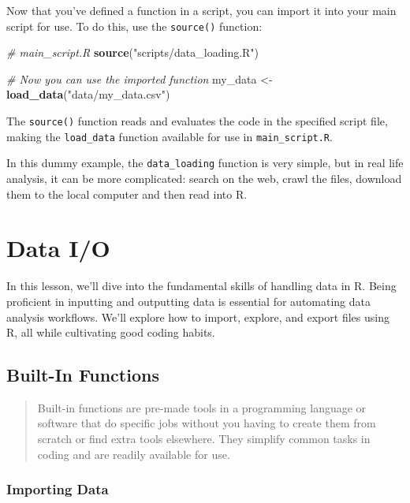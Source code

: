 \documentclass[
]{book}
\newenvironment{Shaded}{\begin{snugshade}}{\end{snugshade}}
\newcommand{\CommentTok}[1]{\textcolor[rgb]{0.56,0.35,0.01}{\textit{#1}}}
\newcommand{\FunctionTok}[1]{\textcolor[rgb]{0.13,0.29,0.53}{\textbf{#1}}}
\newcommand{\NormalTok}[1]{#1}
\newcommand{\OtherTok}[1]{\textcolor[rgb]{0.56,0.35,0.01}{#1}}
\newcommand{\StringTok}[1]{\textcolor[rgb]{0.31,0.60,0.02}{#1}}
\begin{document}
Now that you've defined a function in a script, you can import it into your main script for use. To do this, use the \texttt{source()} function:

\begin{Shaded}
\begin{Highlighting}[]
\CommentTok{\# main\_script.R}
\FunctionTok{source}\NormalTok{(}\StringTok{"scripts/data\_loading.R"}\NormalTok{)}

\CommentTok{\# Now you can use the imported function}
\NormalTok{my\_data }\OtherTok{\textless{}{-}} \FunctionTok{load\_data}\NormalTok{(}\StringTok{"data/my\_data.csv"}\NormalTok{)}
\end{Highlighting}
\end{Shaded}

The \texttt{source()} function reads and evaluates the code in the specified script file, making the \texttt{load\_data} function available for use in \texttt{main\_script.R}.

In this dummy example, the \texttt{data\_loading} function is very simple, but in real life analysis, it can be more complicated: search on the web, crawl the files, download them
to the local computer and then read into R.

\hypertarget{data-io}{%
\section{Data I/O}\label{data-io}}

In this lesson, we'll dive into the fundamental skills of handling data in R. Being proficient in inputting and outputting data is essential for automating data analysis workflows. We'll explore how to import, explore, and export files using R, all while cultivating good coding habits.

\hypertarget{built-in-functions}{%
\subsection{Built-In Functions}\label{built-in-functions}}

\begin{quote}
Built-in functions are pre-made tools in a programming language or software that do specific jobs without you having to create them from scratch or find extra tools elsewhere. They simplify common tasks in coding and are readily available for use.
\end{quote}

\hypertarget{importing-data}{%
\subsubsection{Importing Data}\label{importing-data}}
\end{document}
